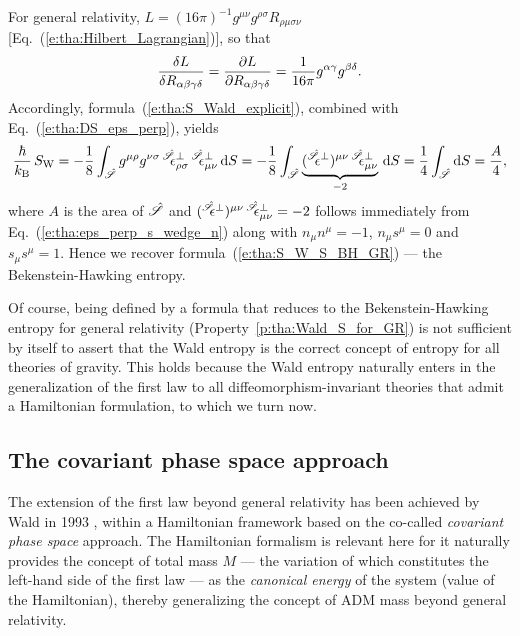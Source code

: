 \begin{example}
For general relativity,  $L = (16\pi)^{-1} g^{\mu\nu} g^{\rho\sigma} R_{\rho\mu\sigma\nu}$
[Eq.~(\ref{e:tha:Hilbert_Lagrangian})], so that
\[
    \frac{\delta L}{\delta R_{\alpha\beta\gamma\delta}} = \frac{\partial L}{\partial R_{\alpha\beta\gamma\delta}}
    = \frac{1}{16\pi} g^{\alpha\gamma} g^{\beta\delta} .
\]
Accordingly, formula~(\ref{e:tha:S_Wald_explicit}), combined with Eq.~(\ref{e:tha:DS_eps_perp}), yields
\[
    \frac{\hbar}{k_{\rm  B}} \, S_{\rm W}  = -\frac{1}{8} \int_{\hat{\Sp}} g^{\mu\rho} g^{\nu\sigma} \,
    {}^{\hat{\Sp}}\!\!\eps^\perp_{\rho\sigma} \, {}^{\hat{\Sp}}\!\!\eps^\perp_{\mu\nu} \,
    \D S
    = - \frac{1}{8} \int_{\hat{\Sp}}
    \underbrace{({}^{\hat{\Sp}}\!\!\eps^\perp)^{\mu\nu} \, {}^{\hat{\Sp}}\!\!\eps^\perp_{\mu\nu}}_{-2} \,  \D S
    = \frac{1}{4} \int_{\hat{\Sp}} \D S  = \frac{A}{4} ,
\]
where $A$ is the area of $\hat{\mathscr{S}}$ and $({}^{\hat{\mathscr{S}}}\!\!\epsilon^\perp)^{\mu\nu} \, {}^{\hat{\mathscr{S}}}\!\!\epsilon^\perp_{\mu\nu}=-2$
follows immediately from Eq.~(\ref{e:tha:eps_perp_s_wedge_n}) along with
$n_\mu n^\mu = -1$, $n_\mu s^\mu = 0$ and $s_\mu s^\mu = 1$.
Hence we recover formula~(\ref{e:tha:S_W_S_BH_GR}) --- the Bekenstein-Hawking entropy.
\end{example}

Of course, being defined by a formula that reduces to the Bekenstein-Hawking entropy
for general relativity (Property~\ref{p:tha:Wald_S_for_GR})
is not sufficient by itself to assert that the Wald entropy
is the correct concept of entropy for all theories
of gravity. This holds because the Wald entropy naturally enters in the
generalization of the first law to all diffeomorphism-invariant theories
that admit a Hamiltonian formulation, to which we turn now.

\subsection{The covariant phase space approach}

The extension of the first law beyond general relativity has been achieved
by Wald in 1993 \cite{Wald93}, within a Hamiltonian
framework based on the co-called \emph{covariant phase space} approach. The Hamiltonian formalism is relevant here for it naturally provides the concept
of total mass $M$ --- the variation of which constitutes the left-hand side of the first law --- as the \emph{canonical energy} of the system (value of the Hamiltonian),
thereby generalizing the concept of ADM mass beyond general relativity.

